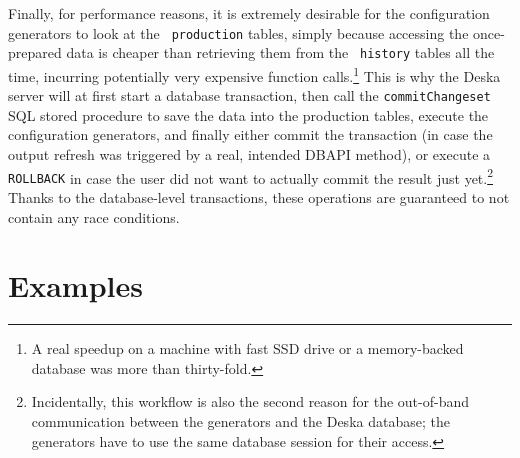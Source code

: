 \documentclass[deska]{subfiles}
\begin{document}
Finally, for performance reasons, it is extremely desirable for the configuration generators to look at the {\tt
production} tables, simply because accessing the once-prepared data is cheaper than retrieving them from the {\tt
history} tables all the time, incurring potentially very expensive function calls.\footnote{A real speedup on a machine
with fast SSD drive or a memory-backed database was more than thirty-fold.}  This is why the Deska server will at
first start a database transaction, then call the {\tt commitChangeset} SQL stored procedure to save the data into the
production tables, execute the configuration generators, and finally either commit the transaction (in case the
output refresh was triggered by a real, intended  DBAPI method), or execute a {\tt
ROLLBACK} in case the user did not want to actually commit the result just yet.\footnote{Incidentally, this workflow is
also the second reason for the out-of-band communication between the generators and the Deska database; the generators
have to use the same database session for their access.} Thanks to the database-level transactions, these operations are
guaranteed to not contain any race conditions.

\section{Examples}

\end{document}
